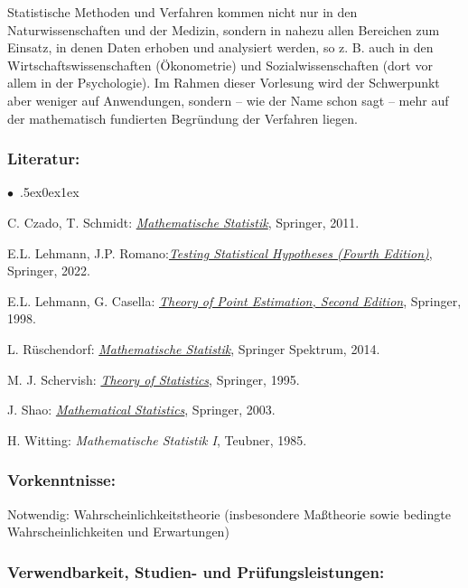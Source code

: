 \documentclass[a4paper,10pt]{article}
\renewenvironment{itemize}{\begin{list}{$\bullet$\ }{\itemsep.5ex\setlength{\topsep}{0.5\itemsep}\parsep0ex\labelsep1ex\settowidth{\labelwidth}{$\bullet$\ }\setlength{\leftmargin}{\labelwidth}\addtolength{\leftmargin}{3ex}\addtolength{\leftmargin}{\labelsep}}}{\end{list}}
\begin{document}
Statistische Methoden und Verfahren kommen nicht nur in den Naturwissenschaften und der Medizin, sondern in nahezu allen Bereichen zum Einsatz, in denen Daten erhoben und analysiert werden, so z. B. auch in den Wirtschaftswissenschaften (Ökonometrie) und Sozialwissenschaften (dort vor allem in der Psychologie). Im Rahmen dieser Vorlesung wird der Schwerpunkt aber weniger auf Anwendungen, sondern – wie der Name schon sagt – mehr auf der mathematisch fundierten Begründung der Verfahren liegen.
\subsubsection*{\large
    Literatur:
}
\begin{itemize}
\item C. Czado, T. Schmidt: \href{https://link.springer.com/book/10.1007/978-3-642-17261-8}{\emph{Mathematische Statistik}}, Springer, 2011.
\item E.L. Lehmann, J.P. Romano:\href{https://link.springer.com/book/10.1007/978-3-030-70578-7}{\emph{Testing Statistical Hypotheses (Fourth Edition)}}, Springer, 2022.
\item E.L. Lehmann, G. Casella: \href{https://link.springer.com/book/10.1007/b98854}{\emph{Theory of Point Estimation, Second Edition}}, Springer, 1998. 
\item  L. Rüschendorf: \href{https://link.springer.com/book/10.1007/978-3-642-41997-3}{\emph{Mathematische Statistik}}, Springer Spektrum, 2014. 
\item  M. J. Schervish: \href{https://link.springer.com/book/10.1007/978-1-4612-4250-5}{\emph{Theory of Statistics}}, Springer, 1995.
\item J. Shao:  \href{https://link.springer.com/book/10.1007/b97553}{\emph{Mathematical Statistics}}, Springer, 2003.
\item H. Witting: \emph{Mathematische Statistik I}, Teubner, 1985.
\end{itemize}
\subsubsection*{\large
    Vorkenntnisse:
}
Notwendig: Wahrscheinlichkeitstheorie (insbesondere Maßtheorie sowie bedingte Wahrscheinlichkeiten und Erwartungen)
\cleardoublepage
\subsubsection*{\large
    Verwendbarkeit, Studien- und Prüfungsleistungen:
}
\end{document}
